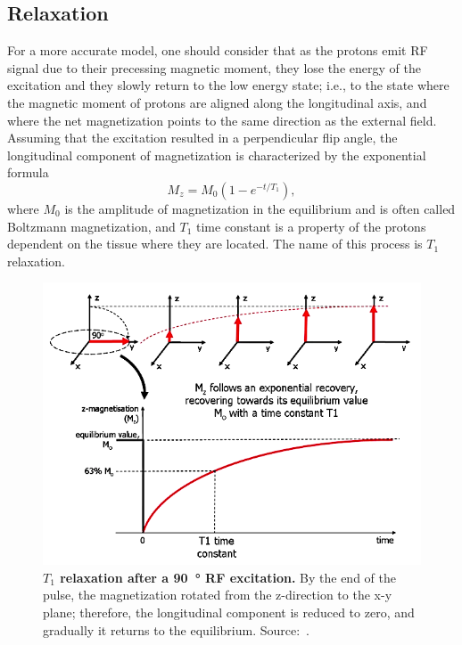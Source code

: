 \subsection{Relaxation}
For a more accurate model, one should consider that as the protons emit RF signal due to their precessing magnetic moment, they lose the energy of the excitation and they slowly return to the low energy state; i.e., to the state where the magnetic moment of protons are aligned along the longitudinal axis, and where the net magnetization points to the same direction as the external field. Assuming that the excitation resulted in a perpendicular flip angle, the longitudinal component of magnetization is characterized by the exponential formula
\[M_z = M_0 (1 - e^{-t/T_1}),\]
where $M_0$ is the amplitude of magnetization in the equilibrium and is often called Boltzmann magnetization, and $T_1$ time constant is a property of the protons dependent on the tissue where they are located. The name of this process is $T_1$ relaxation.

\begin{figure}[thb]
    \centering
    \includegraphics[width=0.8\linewidth]{images/T1_relaxation.png}
    \caption{\textbf{$T_1$ relaxation after a \SI{90}{\degree} RF excitation.} By the end of the pulse, the magnetization rotated from the z-direction to the x-y plane; therefore, the longitudinal component is reduced to zero, and gradually it returns to the equilibrium. Source:~\cite{ridgway_cardiovascular_2010}.}
    \label{fig:T1_relaxation}
\end{figure}

